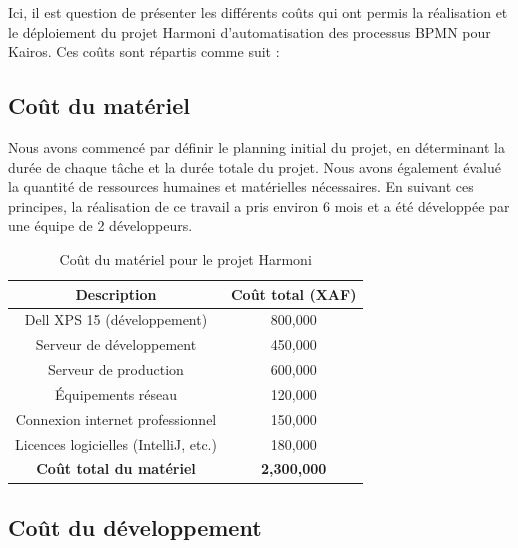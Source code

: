 Ici, il est question de présenter les différents coûts qui ont permis la réalisation et le déploiement du projet Harmoni d'automatisation des processus BPMN pour Kairos. Ces coûts sont répartis comme suit :

\subsection{Coût du matériel}

Nous avons commencé par définir le planning initial du projet, en déterminant la durée de chaque tâche et la durée totale du projet. Nous avons également évalué la quantité de ressources humaines et matérielles nécessaires. En suivant ces principes, la réalisation de ce travail a pris environ 6 mois et a été développée par une équipe de 2 développeurs.

\begin{table}[H]
    \centering
    \begin{tabular}{|c|c|}
        \hline
        \textbf{Description} & \textbf{Coût total (XAF)} \\
        \hline
        Dell XPS 15 (développement) & 800,000 \\
        \hline
        Serveur de développement & 450,000 \\
        \hline
        Serveur de production & 600,000 \\
        \hline
        Équipements réseau & 120,000 \\
        \hline
        Connexion internet professionnel & 150,000 \\
        \hline
        Licences logicielles (IntelliJ, etc.) & 180,000 \\
        \hline
        \textbf{Coût total du matériel} & \textbf{2,300,000} \\
        \hline
    \end{tabular}
    \caption{Coût du matériel pour le projet Harmoni}
    \label{tab:cout_materiel}
\end{table}

\subsection{Coût du développement}

